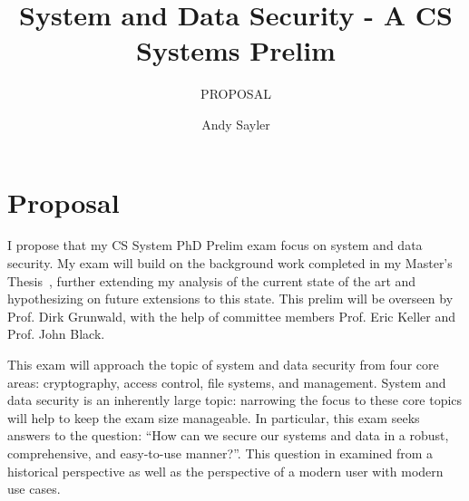 \documentclass{sig-alternate}
\begin{document}
\title{System and Data Security - A CS Systems Prelim}
\subtitle{PROPOSAL}

\author{
  \alignauthor
  Andy Sayler\\
}

\maketitle

\section{Proposal}

I propose that my CS System PhD Prelim exam focus on system and data
security. My exam will build on the background work completed in my
Master's Thesis~\cite{custos-masters}, further extending my analysis
of the current state of the art and hypothesizing on future extensions
to this state. This prelim will be overseen by Prof. Dirk Grunwald,
with the help of committee members Prof. Eric Keller and Prof. John
Black.

This exam will approach the topic of system and data security from
four core areas: cryptography, access control, file systems, and
management. System and data security is an inherently large topic:
narrowing the focus to these core topics will help to keep the exam
size manageable. In particular, this exam seeks answers to the
question: ``How can we secure our systems and data in a robust,
comprehensive, and easy-to-use manner?''. This question in examined
from a historical perspective as well as the perspective of a modern
user with modern use cases.
\end{document}
